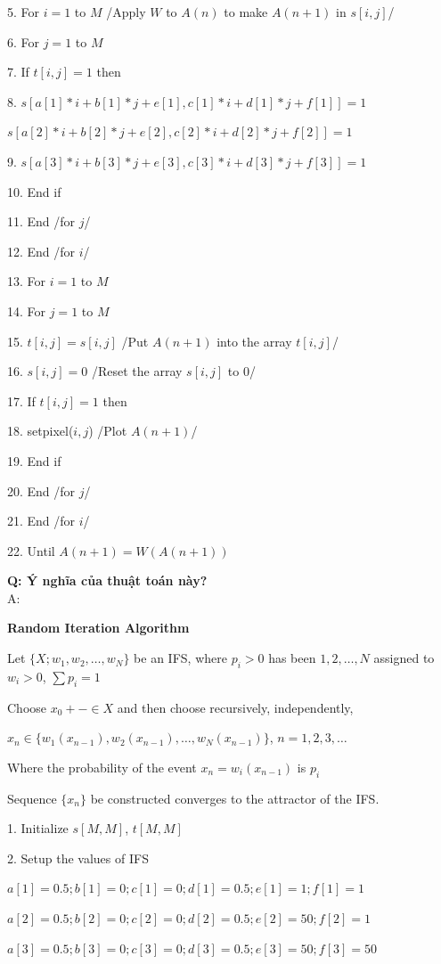 5. For $i=1$ to $M$ /Apply $W$ to $A(n)$ to make $A(n+1)$ in $s[i,j]$/

6. For $j=1$ to $M$

7. If $t[i,j]=1$ then

8. $s[a[1]*i+b[1]*j+e[1], c[1]*i+d[1]*j+f[1]]=1$

$s[a[2]*i+b[2]*j+e[2], c[2]*i+d[2]*j+f[2]]=1$

9. $s[a[3]*i+b[3]*j+e[3], c[3]*i+d[3]*j+f[3]]=1$

10. End if

11. End /for $j$/

12. End /for $i$/

13. For $i=1$ to $M$

14. For $j=1$ to $M$

15. $t[i,j]=s[i,j]$ /Put $A(n+1)$ into the array $t[i,j]$/

16. $s[i,j] =0$ /Reset the array $s[i,j]$ to 0/

17. If $t[i,j]=1$ then

18. setpixel($i,j$) /Plot $A(n+1)$/

19. End if

20. End /for $j$/

21. End /for $i$/

22. Until $A(n+1)=W(A(n+1))$

\textbf{Q: Ý nghĩa của thuật toán này?}\\
A: 


\textbf{Random Iteration Algorithm}

Let $\{X; w_1, w_2, \ldots, w_N\}$ be an IFS, where $p_i > 0$ has been $1, 2, \ldots, N$ assigned to $w_i > 0$, $\sum p_i = 1$

Choose $x_0+- \in X$ and then choose recursively, independently,

$x_n \in \{ w_1(x_{n-1}), w_2(x_{n-1}), \ldots, w_N(x_{n-1}) \}$, $n = 1, 2, 3, \ldots$

Where the probability of the event $x_n = w_i(x_{n-1})$ is $p_i$

Sequence $\{x_n\}$ be constructed converges to the attractor of the IFS.

1. Initialize $s[M,M]$, $t[M,M]$

2. Setup the values of IFS

$a[1]=0.5; b[1]=0; c[1]=0; d[1]=0.5; e[1]=1; f[1]=1$

$a[2]=0.5; b[2]=0; c[2]=0; d[2]=0.5; e[2]=50; f[2]=1$

$a[3]=0.5; b[3]=0; c[3]=0; d[3]=0.5; e[3]=50; f[3]=50$

